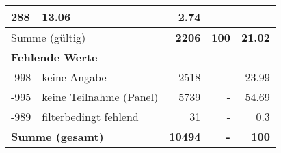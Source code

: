\begin{longtable}{lXrrr}
       \num{288} &
       \num[round-mode=places,round-precision=2]{13.06} &
         \num[round-mode=places,round-precision=2]{2.74} \\
     \midrule
     \multicolumn{2}{l}{Summe (gültig)} &
       \textbf{\num{2206}} &
     \textbf{\num{100}} &
       \textbf{\num[round-mode=places,round-precision=2]{21.02}} \\
     \multicolumn{5}{l}{\textbf{Fehlende Werte}}\\
       -998 &
       keine Angabe &
         \num{2518} &
        - &
         \num[round-mode=places,round-precision=2]{23.99} \\
       -995 &
       keine Teilnahme (Panel) &
         \num{5739} &
        - &
         \num[round-mode=places,round-precision=2]{54.69} \\
       -989 &
       filterbedingt fehlend &
         \num{31} &
        - &
         \num[round-mode=places,round-precision=2]{0.3} \\
     \midrule
     \multicolumn{2}{l}{\textbf{Summe (gesamt)}} &
          \textbf{\num{10494}} &
        \textbf{-} &
        \textbf{\num{100}} \\
     \bottomrule
     \end{longtable}
     
